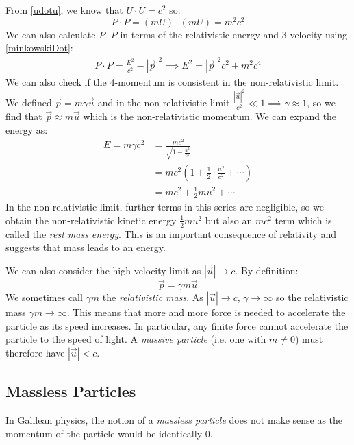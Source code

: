 \documentclass[../main.tex]{subfiles}
\begin{document}
From \cref{udotu}, we know that $U \cdot U = c^2$ so:
\begin{equation}
  P \cdot P = (mU) \cdot (mU) = m^2 c^2 \label{pdotp}
\end{equation}
We can also calculate $P \cdot P$ in terms of the relativistic energy and 3-velocity using \cref{minkowskiDot}:
\begin{align}
  P \cdot P = \frac{E^2}{c^2} - |\vec{p}|^2 \implies E^2 = |\vec{p}|^2 c^2 + m^2 c^4 \label{4MomentumDot}
\end{align}
We can also check if the 4-momentum is consistent in the non-relativistic limit.
We defined $\vec{p} = m\gamma \vec{u}$ and in the non-relativistic limit $\frac{|\vec{u}|^2}{c^2} \ll 1 \implies \gamma \approx 1$, so we find that $\vec{p} \approx m \vec{u}$ which is the non-relativistic momentum.
We can expand the energy as:
\begin{align}
  E = m\gamma c^2 &= \frac{mc^2}{\sqrt{1 - \frac{u^2}{c^2}}} \nonumber \\
                  &= mc^2 \left(1 + \frac{1}{2}\cdot\frac{u^2}{c^2} + \cdots\right) \nonumber \\
                  &= mc^2 + \frac{1}{2}mu^2 + \cdots \label{ENonrelLimit}
\end{align}
In the non-relativistic limit, further terms in this series are negligible, so we obtain the non-relativistic kinetic energy $\frac{1}{2}mu^2$ but also an $mc^2$ term which is called the \textit{rest mass energy}.
This is an important consequence of relativity and suggests that mass leads to an energy.

We can also consider the high velocity limit as $|\vec{u}| \to c$.
By definition:
\[
  \vec{p} = \gamma m \vec{u}
\]
\label{finiteForce}
We sometimes call $\gamma m$ the \textit{relativistic mass}.
As $|\vec{u}| \to c$, $\gamma \to \infty$ so the relativistic mass $\gamma m \to \infty$.
This means that more and more force is needed to accelerate the particle as its speed increases.
In particular, any finite force cannot accelerate the particle to the speed of light.
A \textit{massive particle} (i.e. one with $m \neq 0$) must therefore have $|\vec{u}| < c$.
\subsection{Massless Particles} \label{masslessParticles}
In Galilean physics, the notion of a \textit{massless particle} does not make sense as the momentum of the particle would be identically 0.
\end{document}
